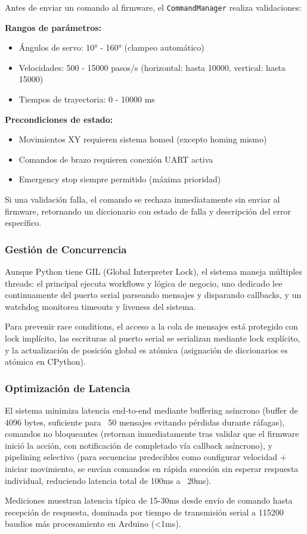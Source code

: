 Antes de enviar un comando al firmware, el \texttt{CommandManager} realiza validaciones:

\textbf{Rangos de parámetros:}
\begin{itemize}[label=$\bullet$]
    \item Ángulos de servo: 10° - 160° (clampeo automático)
    \item Velocidades: 500 - 15000 pasos/s (horizontal: hasta 10000, vertical: hasta 15000)
    \item Tiempos de trayectoria: 0 - 10000 ms
\end{itemize}

\textbf{Precondiciones de estado:}
\begin{itemize}[label=$\bullet$]
    \item Movimientos XY requieren sistema homed (excepto homing mismo)
    \item Comandos de brazo requieren conexión UART activa
    \item Emergency stop siempre permitido (máxima prioridad)
\end{itemize}

Si una validación falla, el comando se rechaza inmediatamente sin enviar al firmware, retornando un diccionario con estado de falla y descripción del error específico.

\subsubsection{Gestión de Concurrencia}

Aunque Python tiene GIL (Global Interpreter Lock), el sistema maneja múltiples threads: el principal ejecuta workflows y lógica de negocio, uno dedicado lee continuamente del puerto serial parseando mensajes y disparando callbacks, y un watchdog monitorea timeouts y liveness del sistema.

Para prevenir race conditions, el acceso a la cola de mensajes está protegido con lock implícito, las escrituras al puerto serial se serializan mediante lock explícito, y la actualización de posición global es atómica (asignación de diccionarios es atómica en CPython).

\subsubsection{Optimización de Latencia}

El sistema minimiza latencia end-to-end mediante buffering asíncrono (buffer de 4096 bytes, suficiente para ~50 mensajes evitando pérdidas durante ráfagas), comandos no bloqueantes (retornan inmediatamente tras validar que el firmware inició la acción, con notificación de completado vía callback asíncrono), y pipelining selectivo (para secuencias predecibles como configurar velocidad + iniciar movimiento, se envían comandos en rápida sucesión sin esperar respuesta individual, reduciendo latencia total de 100ms a ~20ms).

Mediciones muestran latencia típica de 15-30ms desde envío de comando hasta recepción de respuesta, dominada por tiempo de transmisión serial a 115200 baudios más procesamiento en Arduino (<1ms).
